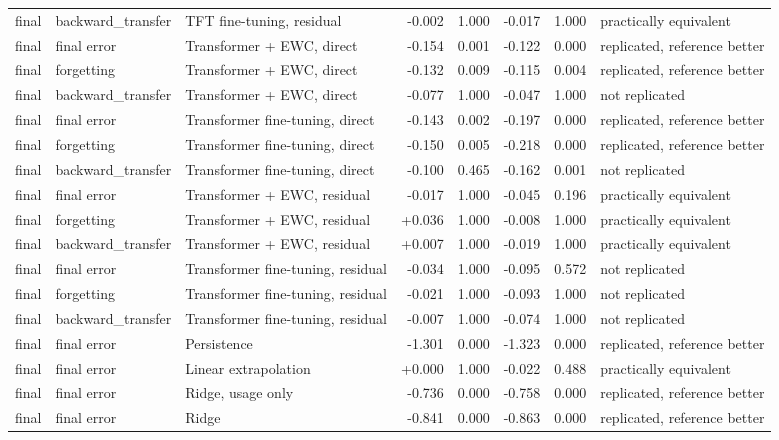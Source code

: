 \begin{table}[t]
\begin{tabular}{lllrrrrl}
    final & backward\_transfer & TFT fine-tuning, residual & -0.002 & 1.000 & -0.017 & 1.000 & practically equivalent \\
    final & final error & Transformer + EWC, direct & -0.154 & 0.001 & -0.122 & 0.000 & replicated, reference better \\
    final & forgetting & Transformer + EWC, direct & -0.132 & 0.009 & -0.115 & 0.004 & replicated, reference better \\
    final & backward\_transfer & Transformer + EWC, direct & -0.077 & 1.000 & -0.047 & 1.000 & not replicated \\
    final & final error & Transformer fine-tuning, direct & -0.143 & 0.002 & -0.197 & 0.000 & replicated, reference better \\
    final & forgetting & Transformer fine-tuning, direct & -0.150 & 0.005 & -0.218 & 0.000 & replicated, reference better \\
    final & backward\_transfer & Transformer fine-tuning, direct & -0.100 & 0.465 & -0.162 & 0.001 & not replicated \\
    final & final error & Transformer + EWC, residual & -0.017 & 1.000 & -0.045 & 0.196 & practically equivalent \\
    final & forgetting & Transformer + EWC, residual & +0.036 & 1.000 & -0.008 & 1.000 & practically equivalent \\
    final & backward\_transfer & Transformer + EWC, residual & +0.007 & 1.000 & -0.019 & 1.000 & practically equivalent \\
    final & final error & Transformer fine-tuning, residual & -0.034 & 1.000 & -0.095 & 0.572 & not replicated \\
    final & forgetting & Transformer fine-tuning, residual & -0.021 & 1.000 & -0.093 & 1.000 & not replicated \\
    final & backward\_transfer & Transformer fine-tuning, residual & -0.007 & 1.000 & -0.074 & 1.000 & not replicated \\
    final & final error & Persistence & -1.301 & 0.000 & -1.323 & 0.000 & replicated, reference better \\
    final & final error & Linear extrapolation & +0.000 & 1.000 & -0.022 & 0.488 & practically equivalent \\
    final & final error & Ridge, usage only & -0.736 & 0.000 & -0.758 & 0.000 & replicated, reference better \\
    final & final error & Ridge & -0.841 & 0.000 & -0.863 & 0.000 & replicated, reference better \\

\end{tabular}
\end{table}
